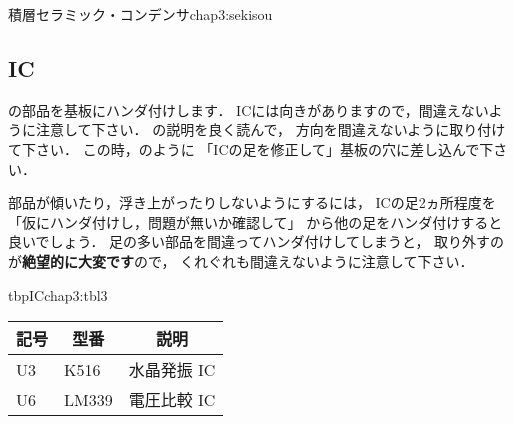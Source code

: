 {積層セラミック・コンデンサ}{chap3:sekisou}

%
%

\subsection{IC}
の部品を基板にハンダ付けします．
ICには向きがありますので，間違えないように注意して下さい．
の説明を良く読んで，
方向を間違えないように取り付けて下さい．
この時，のように
「ICの足を修正して」基板の穴に差し込んで下さい．

部品が傾いたり，浮き上がったりしないようにするには，
ICの足2ヵ所程度を「仮にハンダ付けし，問題が無いか確認して」
から他の足をハンダ付けすると良いでしょう．
足の多い部品を間違ってハンダ付けしてしまうと，
取り外すのが{\bf 絶望的に大変です}ので，
くれぐれも間違えないように注意して下さい．

\begin{mytable}{tbp}{IC}{chap3:tbl3}
{\small\begin{tabular}{l|l|l}
\hline
\hline
\multicolumn{1}{c|}{記号} &
\multicolumn{1}{c|}{型番} &
\multicolumn{1}{c}{説明} \\
\hline
U3 & K516       & 水晶発振 IC \\
U6 & LM339      & 電圧比較 IC \\
\end{tabular}}
\end{mytable}


